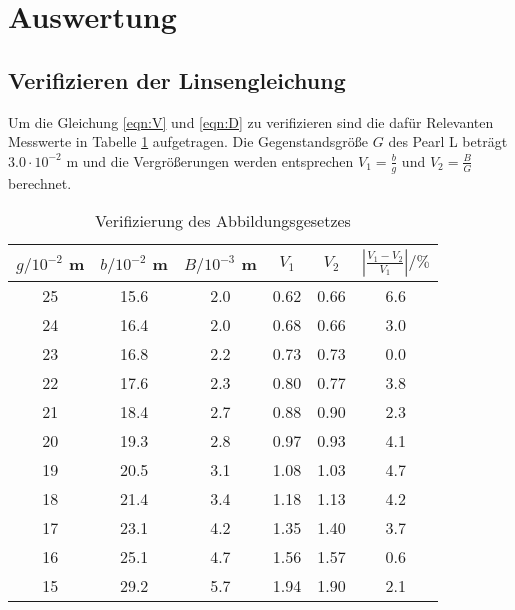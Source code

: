 \section{Auswertung}
\label{sec:Auswertung}
\subsection{Verifizieren der Linsengleichung}
Um die Gleichung \ref{eqn:V} und \ref{eqn:D} zu verifizieren sind die dafür Relevanten Messwerte in Tabelle \ref{tab:VdA} aufgetragen. Die Gegenstandsgröße $G$ des Pearl L beträgt $3.0 \cdot 10^{-2}$ m und die Vergrößerungen werden entsprechen $V_1 = \frac{b}{g}$ und $V_2 = \frac{B}{G}$ berechnet.
\begin{table}
  \centering
  \begin{tabular}{c c c c c c}
    \toprule
    $g / 10^{-2}$ m & $b / 10^{-2}$ m & $B / 10^{-3}$ m & $V_1$ & $V_2$ & $\left\lvert \frac{V_1 - V_2}{V_1} \right\rvert / \% $\\
   \midrule
    25	& 15.6	& 2.0 	& 0.62 & 0.66	& 6.6 	\\
    24	& 16.4	& 2.0	& 0.68 & 0.66	& 3.0	\\
    23	& 16.8	& 2.2	& 0.73 & 0.73	& 0.0	\\
    22	& 17.6	& 2.3	& 0.80 & 0.77	& 3.8	\\
    21	& 18.4	& 2.7	& 0.88 & 0.90	& 2.3	\\
    20	& 19.3	& 2.8	& 0.97 & 0.93	& 4.1	\\
    19	& 20.5	& 3.1	& 1.08 & 1.03	& 4.7	\\
    18	& 21.4	& 3.4	& 1.18 & 1.13	& 4.2	\\
    17	& 23.1	& 4.2	& 1.35 & 1.40	& 3.7	\\
    16	& 25.1	& 4.7	& 1.56 & 1.57	& 0.6	\\
    15	& 29.2	& 5.7	& 1.94 & 1.90	& 2.1	\\
    \bottomrule
  \end{tabular}
  \caption{Verifizierung des Abbildungsgesetzes}
  \label{tab:VdA}
\end{table}
